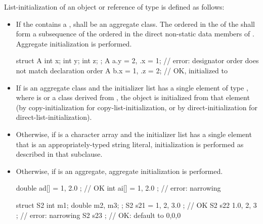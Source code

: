 \pnum
List-initialization of an object or reference of type  is defined as follows:
\begin{itemize}
\item
If the 
contains a ,
 shall be an aggregate class.
The ordered 
in the 
of the 
shall form a subsequence
of the ordered 
in the direct non-static data members of .
Aggregate initialization is performed.
\begin{example}
\begin{codeblock}
struct A { int x; int y; int z; };
A a{.y = 2, .x = 1};                // error: designator order does not match declaration order
A b{.x = 1, .z = 2};                // OK,  initialized to 
\end{codeblock}
\end{example}

\item If  is an aggregate class and the initializer list has a single element
of type  ,
where  is  or a class derived from ,
the object is initialized from that element (by copy-initialization for
copy-list-initialization, or by direct-initialization for
direct-list-initialization).

\item Otherwise, if  is a character array and the initializer list has a
single element that is an appropriately-typed string literal,
initialization is performed as described in that subclause.

\item Otherwise, if  is an aggregate, aggregate initialization is
performed.

\begin{example}
\begin{codeblock}
double ad[] = { 1, 2.0 };           // OK
int ai[] = { 1, 2.0 };              // error: narrowing

struct S2 {
  int m1;
  double m2, m3;
};
S2 s21 = { 1, 2, 3.0 };             // OK
S2 s22 { 1.0, 2, 3 };               // error: narrowing
S2 s23 { };                         // OK: default to 0,0,0
\end{codeblock}
\end{example}


\end{itemize}
